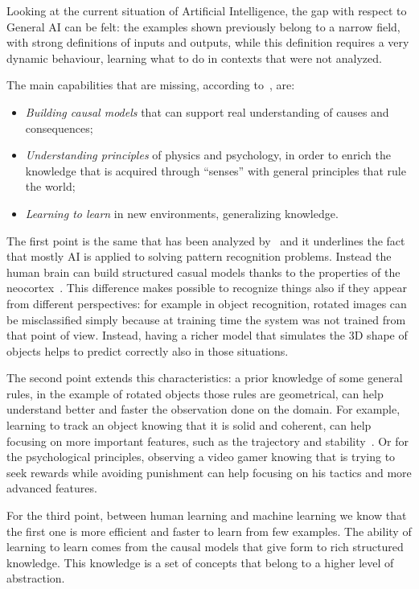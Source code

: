 Looking at the current situation of Artificial Intelligence, the gap with respect to General AI can be felt: the examples shown previously belong to a narrow field, with strong definitions of inputs and outputs, while this definition requires a very dynamic behaviour, learning what to do in contexts that were not analyzed.

The main capabilities that are missing, according to~\cite{lake2017building}, are:

\begin{itemize}
	\item \textit{Building causal models} that can support real understanding of causes and consequences;
	\item \textit{Understanding principles} of physics and psychology, in order to enrich the knowledge that is acquired through ``senses''  with general principles that rule the world;
	\item \textit{Learning to learn} in new environments, generalizing knowledge.
\end{itemize}

The first point is the same that has been analyzed by~\cite{pearl2018theoretical} and it underlines the fact that mostly AI is applied to solving pattern recognition problems. Instead the human brain can build structured casual models thanks to the properties of the neocortex~\cite{hawkins2017theory}. This difference makes possible to recognize things also if they appear from different perspectives: for example in object recognition, rotated images can be misclassified simply because at training time the system was not trained from that point of view. Instead, having a richer model that simulates the 3D shape of objects helps to predict correctly also in those situations.

The second point extends this characteristics: a prior knowledge of some general rules, in the example of rotated objects those rules are geometrical, can help understand better and faster the observation done on the domain. For example, learning to track an object knowing that it is solid and coherent, can help focusing on more important features, such as the trajectory and stability~\cite{lerer2016learning}. Or for the psychological principles, observing a video gamer knowing that is trying to seek rewards while avoiding punishment can help focusing on his tactics and more advanced features.

For the third point, between human learning and machine learning we know that the first one is more efficient and faster to learn from few examples. The ability of learning to learn comes from the causal models that give form to rich structured knowledge. This knowledge is a set of concepts that belong to a higher level of abstraction.

